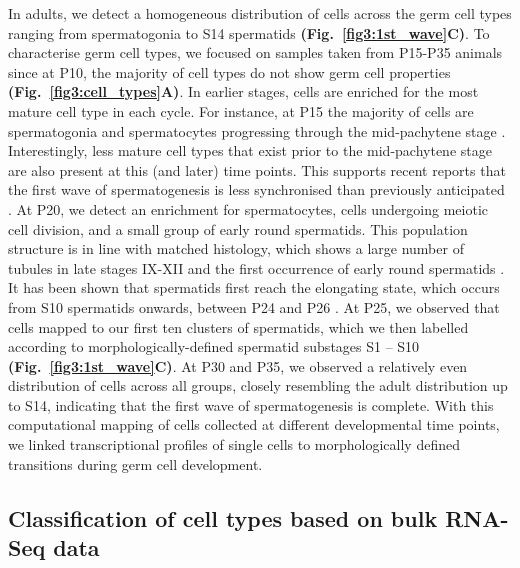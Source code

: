 In adults, we detect a homogeneous distribution of cells across the germ cell types ranging from spermatogonia to S14 spermatids \textbf{(Fig.~\ref{fig3:1st_wave}C)}. 
To characterise germ cell types, we focused on samples taken from P15-P35 animals since at P10, the majority of cell types do not show germ cell properties \textbf{(Fig.~\ref{fig3:cell_types}A)}. 
In earlier stages, cells are enriched for the most mature cell type in each cycle. 
For instance, at P15 the majority of cells are spermatogonia and spermatocytes progressing through the mid-pachytene stage \citep{Turner2004}. 
Interestingly, less mature cell types that exist prior to the mid-pachytene stage are also present at this (and later) time points. 
This supports recent reports that the first wave of spermatogenesis is less synchronised than previously anticipated \citep{Snyder2010}. 
At P20, we detect an enrichment for spermatocytes, cells undergoing meiotic cell division, and a small group of early round spermatids. 
This population structure is in line with matched histology, which shows a large number of tubules in late stages IX-XII and the first occurrence of early round spermatids \citep{Bellve1977}. 
It has been shown that spermatids first reach the elongating state, which occurs from S10 spermatids onwards, between P24 and P26 \citep{Janca1986}. 
At P25, we observed that cells mapped to our first ten clusters of spermatids, which we then labelled according to morphologically-defined spermatid substages S1 – S10 \textbf{(Fig.~\ref{fig3:1st_wave}C)}. 
At P30 and P35, we observed a relatively even distribution of cells across all groups, closely resembling the adult distribution up to S14, indicating that the first wave of spermatogenesis is complete. 
With this computational mapping of cells collected at different developmental time points, we linked transcriptional profiles of single cells to morphologically defined transitions during germ cell development.

\newpage

\subsection{Classification of cell types based on bulk RNA-Seq data}

